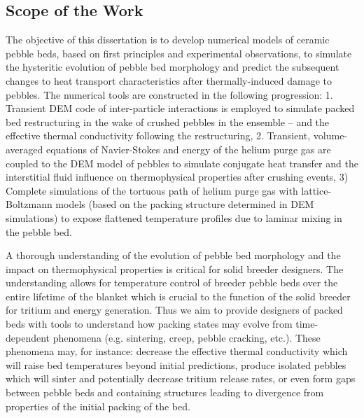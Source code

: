 \subsection{Scope of the Work}\label{sec:intro-scope-of-work}
The objective of this dissertation is to develop numerical models of ceramic pebble beds, based on first principles and experimental observations, to simulate the hysteritic evolution of pebble bed morphology and predict the subsequent changes to heat transport characteristics after thermally-induced damage to pebbles. The numerical tools are constructed in the following progression: 1. Transient DEM code of inter-particle interactions is employed to simulate packed bed restructuring in the wake of crushed pebbles in the ensemble -- and the effective thermal conductivity following the restructuring, 2. Transient, volume-averaged equations of Navier-Stokes and energy of the helium purge gas are coupled to the DEM model of pebbles to simulate conjugate heat transfer and the interstitial fluid influence on thermophysical properties after crushing events, 3) Complete simulations of the tortuous path of helium purge gas with lattice-Boltzmann models (based on the packing structure determined in DEM simulations) to expose flattened temperature profiles due to laminar mixing in the pebble bed. 

A thorough understanding of the evolution of pebble bed morphology and the impact on thermophysical properties is critical for solid breeder designers. The understanding allows for temperature control of breeder pebble beds over the entire lifetime of the blanket which is crucial to the function of the solid breeder for tritium and energy generation. Thus we aim to provide designers of packed beds with tools to understand how packing states may evolve from time-dependent phenomena (e.g. sintering, creep, pebble cracking, etc.). These phenomena may, for instance: decrease the effective thermal conductivity which will raise bed temperatures beyond initial predictions, produce isolated pebbles which will sinter and potentially decrease tritium release rates, or even form gaps between pebble beds and containing structures leading to divergence from properties of the initial packing of the bed.

